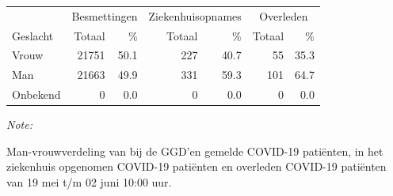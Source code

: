 \documentclass[
  english,
  man,floatsintext]{apa6}
\begin{document}
\begin{table}
\centering\begingroup\fontsize{11}{13}\selectfont

\begin{threeparttable}
\begin{tabular}{lrrrrrr}
\toprule
\multicolumn{1}{c}{ } & \multicolumn{2}{c}{Besmettingen} & \multicolumn{2}{c}{Ziekenhuisopnames} & \multicolumn{2}{c}{Overleden} \\
\cmidrule(l{3pt}r{3pt}){2-3} \cmidrule(l{3pt}r{3pt}){4-5} \cmidrule(l{3pt}r{3pt}){6-7}
Geslacht & Totaal & \% & Totaal & \% & Totaal & \%\\
\midrule
Vrouw & 21751 & 50.1 & 227 & 40.7 & 55 & 35.3\\
Man & 21663 & 49.9 & 331 & 59.3 & 101 & 64.7\\
Onbekend & 0 & 0.0 & 0 & 0.0 & 0 & 0.0\\
\bottomrule
\end{tabular}
\begin{tablenotes}
\item \textit{Note: } 
\item Man-vrouwverdeling van bij de GGD’en gemelde COVID-19 patiënten, in het ziekenhuis opgenomen COVID-19 patiënten en overleden COVID-19 patiënten van 19 mei t/m 02 juni 10:00 uur.
\end{tablenotes}
\end{threeparttable}
\endgroup{}
\end{table}
\newpage
\end{document}
